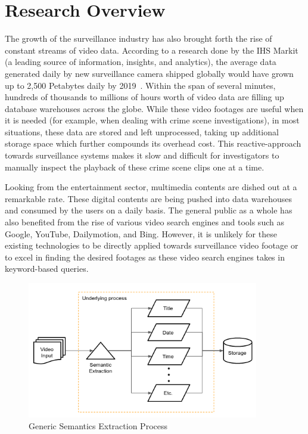 \section{Research Overview}
\label{section:introduction}

The growth of the surveillance industry has also brought forth the rise of
constant streams of video data. According to a research done by the IHS Markit
(a leading source of information, insights, and analytics), the average data
generated daily by new surveillance camera shipped globally would have grown up
to 2,500 Petabytes daily by 2019~\cite{woodhouse2016big}.
Within the span of several minutes, hundreds of thousands %
to millions of hours worth of video data are filling up database warehouses across the globe.
While these video footages are useful when it is needed (for example, when
dealing with crime scene investigations), in most situations, these data are stored and left unprocessed, taking up additional storage space which further compounds its overhead cost.
This reactive-approach towards surveillance systems makes it slow and difficult for investigators to manually inspect the playback of these crime scene clips one at a time.

Looking from the entertainment sector, multimedia contents are dished out at a
remarkable rate. These digital contents are being pushed into data warehouses
and consumed by the users on a daily basis. The general public as a whole has
also benefited from the rise of various video search engines and tools such as
Google, YouTube, Dailymotion, and Bing. However, it is unlikely for these
existing technologies to be directly applied towards surveillance video footage
or to excel in finding the desired footages as these video search engines takes
in keyword-based queries.


\begin{figure}[!hbt]\centering
\includegraphics[width=0.9\textwidth]{image/general/simpleframe3.png}
\caption{Generic Semantics Extraction Process}
\label{fig:exampleframework2}
\end{figure}

